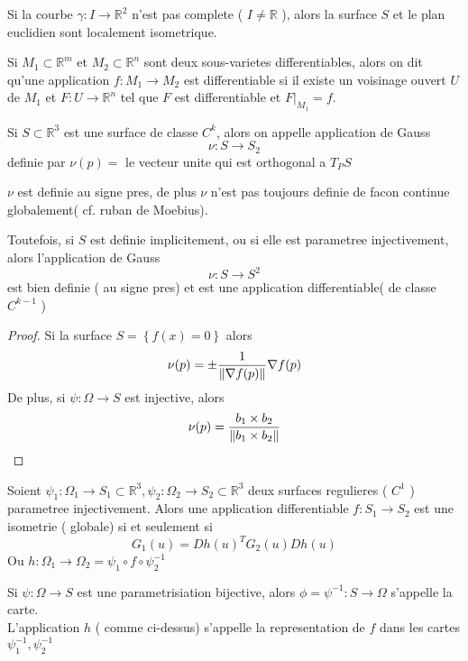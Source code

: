 \documentclass[../main.tex]{subfiles}
\begin{document}
\begin{rmq}
Si la courbe $\gamma: I\to \mathbb{R}^{2}$ n'est pas complete ( $I\neq \mathbb{R}$ ), alors la surface $S$ et le plan euclidien sont localement isometrique.
\end{rmq}
\begin{defn}
Si $M_1 \subset \mathbb{R}^m$ et $M_2 \subset \mathbb{R}^n$ sont deux sous-varietes differentiables, alors on dit qu'une application $f: M_1\to M_2$ est differentiable si il existe un voisinage ouvert $U$ de $M_1$ et $F: U \to \mathbb{R}^n$ tel que $F$ est differentiable et $F|_{M_1} =f $.
\end{defn}
\begin{exemple}
Si $S \subset \mathbb{R}^{3}$ est une surface de classe $C^{k}$, alors on appelle application de Gauss
\[ 
\nu: S \to S_2
\]
definie par $\nu( p) = $ le vecteur unite qui est orthogonal a $T_PS$ 
\end{exemple}
\begin{rmq}
$\nu$ est definie au signe pres, de plus $\nu$ n'est pas toujours definie de facon continue globalement( cf. ruban de Moebius).
\end{rmq}
Toutefois, si $S$ est definie implicitement, ou si elle est parametree injectivement, alors l'application de Gauss
\[ 
\nu: S\to S^{2}
\]
est bien definie ( au signe pres) et est une application differentiable( de classe $C^{k-1}$ )
\begin{proof}
Si la surface $S= \left\{ f( x) =0 \right\} $ alors
\[ 
\nu( p) = \pm \frac{1}{\left\lVert \nabla f( p) \right\rVert } \nabla f( p)  
\]
De plus, si $\psi: \Omega\to S$ est injective, alors
\[ 
\nu( p) = \frac{b_1\times b_2}{\left\lVert  b_1\times b_2 \right\rVert}
\]

\end{proof}
\begin{propo}
Soient $\psi_1: \Omega_1\to S_1\subset \mathbb{R}^{3}, \psi_2: \Omega_2\to S_2\subset \mathbb{R}^{3}$ deux surfaces regulieres ( $C^{1}$ ) parametree injectivement. Alors une application differentiable $f: S_1\to S_2$ est une isometrie ( globale) si et seulement si 
\[ 
G_1( u) = Dh( u) ^{T}G_2( u) Dh( u) 
\]
Ou $h: \Omega_1\to \Omega_2= \psi_1 \circ f \circ \psi_2^{-1}$ 
\end{propo}
\begin{defn}
	Si $\psi : \Omega \to S$ est une parametrisiation bijective, alors $\phi =\psi^{-1}: S \to \Omega$ s'appelle la carte.\\
	L'application $h$ ( comme ci-dessus) 	s'appelle la representation de $f$ dans les cartes $\psi_1^{-1},\psi_2^{-1}$ 
\end{defn}
\end{document}
